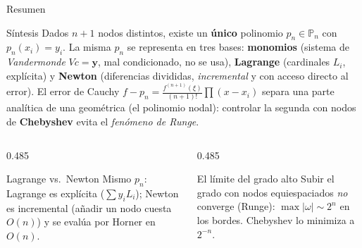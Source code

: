 \documentclass[aspectratio=169,10pt]{beamer}
\begin{document}
\begin{frame}{Resumen}
\begin{cardidea}{Síntesis}{\faLightbulb}
Dados $n{+}1$ nodos distintos, existe un \textbf{único} polinomio $p_n\in\mathbb P_n$ con $p_n(x_i)=y_i$. La misma $p_n$ se representa en tres bases: \textbf{monomios} (sistema de \emph{Vandermonde} $Vc=\mathbf y$, mal condicionado, no se usa), \textbf{Lagrange} (cardinales $L_i$, explícita) y \textbf{Newton} (diferencias divididas, \emph{incremental} y con acceso directo al error). El error de Cauchy $f-p_n=\tfrac{f^{(n+1)}(\xi)}{(n+1)!}\prod(x-x_i)$ separa una parte analítica de una geométrica (el polinomio nodal): controlar la segunda con nodos de \textbf{Chebyshev} evita el \emph{fenómeno de Runge}.
\end{cardidea}
\vspace{2mm}
\begin{columns}[T]
\begin{column}{0.485\textwidth}
\begin{cardgear}{Lagrange vs.\ Newton}{\faCogs}
Mismo $p_n$: Lagrange es explícita ($\sum y_iL_i$); Newton es incremental (añadir un nodo cuesta $O(n)$) y se evalúa por Horner en $O(n)$.
\end{cardgear}
\end{column}
\begin{column}{0.485\textwidth}
\begin{cardgear}{El límite del grado alto}{\faCogs}
Subir el grado con nodos equiespaciados \emph{no} converge (Runge): $\max|\omega|\sim2^n$ en los bordes. Chebyshev lo minimiza a $2^{-n}$.
\end{cardgear}
\end{column}
\end{columns}
\end{frame}
\end{document}
